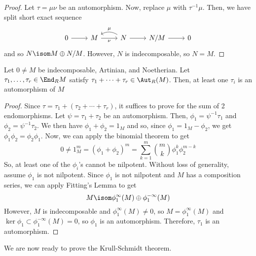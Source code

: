 \documentclass[11pt,leqno,oneside]{amsbook}
\numberwithin{thm}{section}
\begin{document}
\begin{proof}
  Let \(\tau = \mu \nu\) be an automorphism. Now, replace \(\mu\) with
  \(\tau^{-1} \mu\). Then, we have split short exact sequence \[
    \begin{tikzcd}
      0 \rar & M \ar[r,swap,"\nu"] & N \rar \ar[l,bend right = 30, swap,"\mu"] & N/M \rar & 0
    \end{tikzcd}
  \]
  and so \(N \isom M \oplus N/M\). However, \(N\) is indecomposable,
  so \(N = M\).
\end{proof}
\begin{lem}
  Let \(0 \neq M\) be indecomposable, Artinian, and Noetherian. Let \(\tau_1, \ldots, \tau_r \in \End_R M\) satisfy \(\tau_1 +
  \cdots + \tau_r \in \Aut_R (M)\). Then, at least one \(\tau_i\) is
  an automorphism of \(M\)
\end{lem}
\begin{proof}
  Since \(\tau = \tau_1 + (\tau_2 + \cdots + \tau_r)\), it suffices to
  prove for the sum of 2 endomorphisms. Let \(\psi = \tau_1 + \tau_2\)
  be an automorphism. Then, \(\phi_1 = \psi^{-1} \tau_1\) and \(\phi_2
  = \psi^{-1} \tau_2\). We then have \(\phi_1 + \phi_2 = 1_M\) and so,
  since \(\phi_1 = 1_M - \phi_2\), we get \(\phi_1 \phi_2 = \phi_2
  \phi_1\). Now, we can apply the binomial theorem to get \[
    0 \neq 1_M^m = (\phi_1 + \phi_2)^m = \sum_{k=1}^m \binom{m}{k} \phi_1^k \phi_2^{m-k}
  \]
  So, at least one of the \(\phi_i\)'s cannot be nilpotent. Without
  loss of generality, assume \(\phi_1\) is not nilpotent. Since
  \(\phi_1\) is not nilpotent and \(M\) has a composition series, we
  can apply Fitting's Lemma to get \[
    M \isom \phi_1^\infty(M) \oplus \phi_1^{-\infty}(M)
  \]
  However, \(M\) is indecomposable and \(\phi_1^\infty(M) \neq 0\), so
  \(M = \phi_1^\infty(M)\) and \(\ker \phi_1 \subset
  \phi_1^{-\infty}(M) = 0\), so \(\phi_1\) is an
  automorphism. Therefore, \(\tau_1\) is an automorphism.
\end{proof}
We are now ready to prove the Krull-Schmidt theorem.
\end{document}
